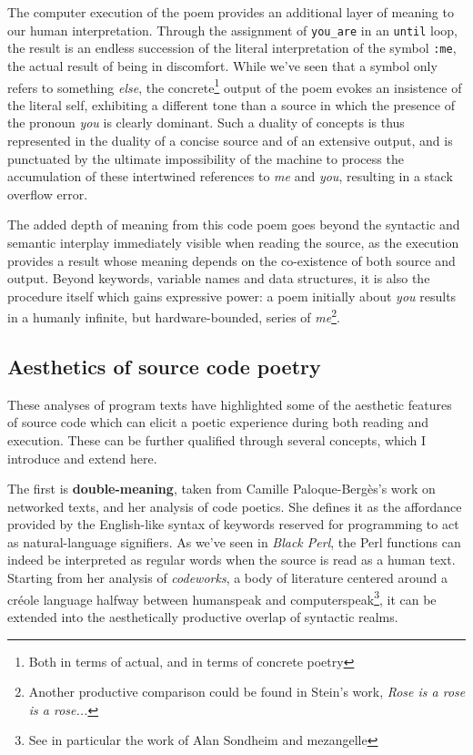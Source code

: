 \documentclass{article}
\begin{document}
The computer execution of the poem provides an additional layer of meaning to our human interpretation. Through the assignment of \lstinline{you_are} in an \lstinline{until} loop, the result is an endless succession of the literal interpretation of the symbol \lstinline{:me}, the actual result of being in discomfort. While we've seen that a symbol only refers to something \emph{else}, the concrete\footnote{Both in terms of actual, and in terms of concrete poetry} output of the poem evokes an insistence of the literal self, exhibiting a different tone than a source in which the presence of the pronoun \emph{you} is clearly dominant. Such a duality of concepts is thus represented in the duality of a concise source and of an extensive output, and is punctuated by the ultimate impossibility of the machine to process the accumulation of these intertwined references to \emph{me} and \emph{you}, resulting in a stack overflow error.

The added depth of meaning from this code poem goes beyond the syntactic and semantic interplay immediately visible when reading the source, as the execution provides a result whose meaning depends on the co-existence of both source and output. Beyond keywords, variable names and data structures, it is also the procedure itself which gains expressive power: a poem initially about \emph{you} results in a humanly infinite, but hardware-bounded, series of \emph{me}\footnote{Another productive comparison could be found in Stein's work, \emph{Rose is a rose is a rose...}}.

\subsection{Aesthetics of source code poetry}

These analyses of program texts have highlighted some of the aesthetic features of source code which can elicit a poetic experience during both reading and execution. These can be further qualified through several concepts, which I introduce and extend here.

The first is \textbf{double-meaning}, taken from Camille Paloque-Bergès's work on networked texts, and her analysis of code poetics\cite{paloque-berges_poetique_2009}. She defines it as the affordance provided by the English-like syntax of keywords reserved for programming to act as natural-language signifiers. As we've seen in \emph{Black Perl}, the Perl functions can indeed be interpreted as regular words when the source is read as a human text. Starting from her analysis of \emph{codeworks}, a body of literature centered around a créole language halfway between humanspeak and computerspeak\footnote{See in particular the work of Alan Sondheim and mezangelle}, it can be extended into the aesthetically productive overlap of syntactic realms.
\end{document}
